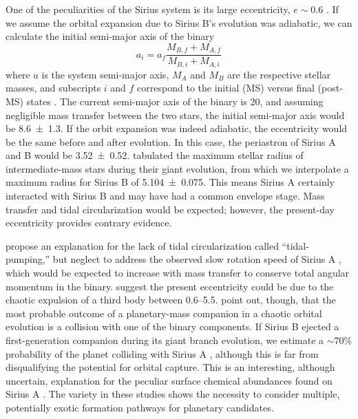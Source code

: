 \documentclass[twocolumn,linenumbers]{aastex631}
\begin{document}
One of the peculiarities of the Sirius system is its large eccentricity, $e\sim0.6$ \citep{bondSiriusSystemIts2017}. If we assume the orbital expansion due to Sirius B's evolution was adiabatic, we can calculate the initial semi-major axis of the binary
\begin{equation}
    a_i = a_f \frac{M_{B,f} + M_{A,f}}{M_{B,i} + M_{A,i}}
\end{equation}
where $a$ is the system semi-major axis, $M_A$ and $M_B$ are the respective stellar masses, and subscripts $i$ and $f$ correspond to the initial (MS) versus final (post-MS) states \citep{jeansCosmogonicProblemsAssociated1924}. The current semi-major axis of the binary is \qty{20}{\au}, and assuming negligible mass transfer between the two stars, the initial semi-major axis would be \qty{8.6\pm1.3}{\au}. If the orbit expansion was indeed adiabatic, the eccentricity would be the same before and after evolution. In this case, the periastron of Sirius A and B would be \qty{3.52\pm0.52}{\au}. \citet{verasPostmainsequencePlanetarySystem2016} tabulated the maximum stellar radius of intermediate-mass stars during their giant evolution, from which we interpolate a maximum radius for Sirius B of \qty{5.104\pm0.075}{\au}. This means Sirius A certainly interacted with Sirius B and may have had a common envelope stage. Mass transfer and tidal circularization would be expected; however, the present-day eccentricity provides contrary evidence.

\citet{bonacicmarinovicOrbitalEccentricitiesBinary2008} propose an explanation for the lack of tidal circularization called ``tidal-pumping,'' but neglect to address the observed slow rotation speed of Sirius A \citep{grayPreciseRotationRates2014,takedaRotationalVelocitySirius2020a}, which would be expected to increase with mass transfer to conserve total angular momentum in the binary. \citet{peretsTripleEvolutionDynamical2012} suggest the present eccentricity could be due to the chaotic expulsion of a third body between \qtyrange{0.6}{5.5}{\solarmass}. \citet{kratterStarHoppersPlanet2012} point out, though, that the most probable outcome of a planetary-mass companion in a chaotic orbital evolution is a collision with one of the binary components. If Sirius B ejected a first-generation companion during its giant branch evolution, we estimate a $\sim$70\% probability of the planet colliding with Sirius A \citep[Fig. 7]{kratterStarHoppersPlanet2012}, although this is far from disqualifying the potential for orbital capture. This is an interesting, although uncertain, explanation for the peculiar surface chemical abundances found on Sirius A \citep{landstreetAbundancesElementsHe2011a,takedaRotationalVelocitySirius2020a}. The variety in these studies shows the necessity to consider multiple, potentially exotic formation pathways for planetary candidates.
\end{document}
